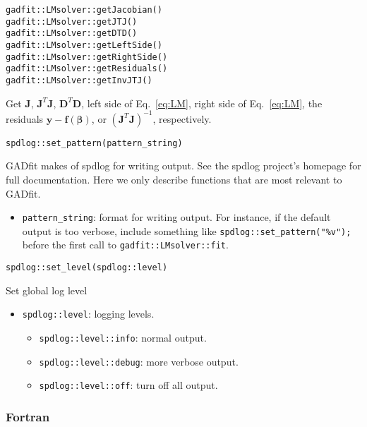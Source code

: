 \documentclass{article}
\begin{document}
\begin{verbatim}
gadfit::LMsolver::getJacobian()
gadfit::LMsolver::getJTJ()
gadfit::LMsolver::getDTD()
gadfit::LMsolver::getLeftSide()
gadfit::LMsolver::getRightSide()
gadfit::LMsolver::getResiduals()
gadfit::LMsolver::getInvJTJ()
\end{verbatim}
Get $\bm J$, $\bm J^T\bm J$, $\bm D^T\bm D$, left side of Eq.~\eqref{eq:LM}, right side of Eq.~\eqref{eq:LM}, the residuals $\bm y - \bm f(\bm \beta)$, or $(\bm J^T\bm J)^{-1}$, respectively.

\begin{verbatim}
spdlog::set_pattern(pattern_string)
\end{verbatim}
GADfit makes of spdlog for writing output. See the spdlog project's homepage for full documentation. Here we only describe functions that are most relevant to GADfit.
\begin{itemize}
\item \verb+pattern_string+: format for writing output. For instance, if the default output is too verbose, include something like \verb+spdlog::set_pattern("%v");+ before the first call to \verb+gadfit::LMsolver::fit+.
\end{itemize}

\begin{verbatim}
spdlog::set_level(spdlog::level)
\end{verbatim}
Set global log level
\begin{itemize}
\item \verb+spdlog::level+: logging levels.
  \begin{itemize}
  \item \verb+spdlog::level::info+: normal output.
  \item \verb+spdlog::level::debug+: more verbose output.
  \item \verb+spdlog::level::off+: turn off all output.
  \end{itemize}
\end{itemize}

\subsubsection{\label{sec:input_fortran}Fortran}
\end{document}
